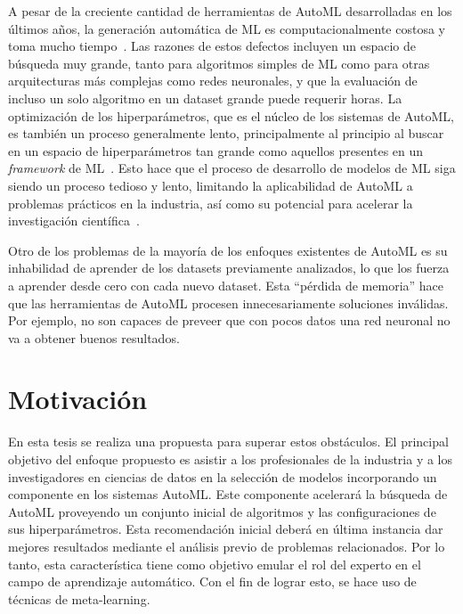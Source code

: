 A pesar de la creciente cantidad de herramientas de AutoML desarrolladas en los últimos años, la generación automática de ML es computacionalmente costosa y toma mucho tiempo~\cite{crisan2021fits}. Las razones de estos defectos incluyen un espacio de búsqueda muy grande, tanto para algoritmos simples de ML como para otras arquitecturas más complejas como redes neuronales, y que la evaluación de incluso un solo algoritmo en un dataset grande puede requerir horas. La optimización de los hiperparámetros, que es el núcleo de los sistemas de AutoML, es también un proceso generalmente lento, principalmente al principio al buscar en un espacio de hiperparámetros tan grande como aquellos presentes en un \textit{framework} de ML~\cite{fuerer2015efficient}. Esto hace que el proceso de desarrollo de modelos de ML siga siendo un proceso tedioso y lento, limitando la aplicabilidad de AutoML a problemas prácticos en la industria, así como su potencial para acelerar la investigación científica~\cite{crisan2021fits}.

Otro de los problemas de la mayoría de los enfoques existentes de AutoML es su inhabilidad de aprender de los datasets previamente analizados, lo que los fuerza a aprender desde cero con cada nuevo dataset. Esta ``pérdida de memoria'' hace que las herramientas de AutoML procesen innecesariamente soluciones inválidas. Por ejemplo, no son capaces de preveer que con pocos datos una red neuronal no va a obtener buenos resultados. 



\section*{Motivación}

En esta tesis se realiza una propuesta para superar estos obstáculos. El principal objetivo del enfoque propuesto es asistir a los profesionales de la industria y a los investigadores en ciencias de datos en la selección de modelos incorporando un componente en los sistemas AutoML. Este componente acelerará la búsqueda de AutoML proveyendo un conjunto inicial de algoritmos y las configuraciones de sus hiperparámetros. Esta recomendación inicial deberá en última instancia dar mejores resultados mediante el análisis previo de problemas relacionados. Por lo tanto, esta característica tiene como objetivo emular el rol del experto en el campo de aprendizaje automático. Con el fin de lograr esto, se hace uso de técnicas de meta-learning. 

